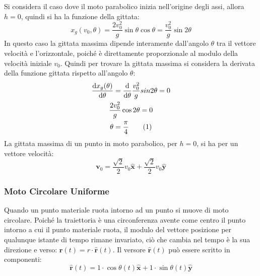\documentclass{article}
\newcommand{\vect}[1]{\boldsymbol{\mathbf{#1}}}
\newcommand{\df}{\mathrm{d}}
\numberwithin{equation}{subsection}
\begin{document}
Si considera il caso dove il moto parabolico inizia nell'origine 
degli assi, allora $h=0$, quindi si ha la funzione della gittata:
\begin{equation}
    x_g(v_0,\theta)=\displaystyle\frac{2v_0^2}{g}\sin\theta \cos\theta=\frac{v_0^2}{g}\sin2\theta
\end{equation}
In questo caso la gittata massima dipende interamente dall'angolo 
$\theta$ tra il vettore velocità e l'orizzontale, poiché è direttamente proporzionale al modulo della velocità iniziale $v_0$. Quindi
per trovare la gittata massima si considera la derivata della funzione gittata rispetto all'angolo $\theta$: 
\begin{gather*}
    \displaystyle\frac{\df x_g(\theta)}{\df\theta}=\frac{\df}{\df\theta}\frac{v_0^2}{g}sin2\theta=0\\
    \displaystyle\frac{2v_0^2}{g}\cos2\theta=0\\
    \theta=\displaystyle\frac{\pi}{4}\tag{\stepcounter{equation}\theequation}
\end{gather*}
La gittata massima di un punto in moto parabolico, per $h=0$, 
si ha per un vettore velocità:
\begin{equation} 
    \vect{v}_0=\displaystyle\frac{\sqrt{2}}{2}v_0\hat{\vect{x}}+\frac{\sqrt{2}}{2}v_0\hat{\vect{y}}
\end{equation}

\subsubsection{Moto Circolare Uniforme}

Quando un punto materiale ruota intorno ad un punto si muove di moto circolare.
Poiché la traiettoria è una circonferenza avente come centro il 
punto intorno a cui il punto materiale ruota, il modulo del vettore posizione 
per qualunque istante di tempo rimane invariato, ciò che cambia nel tempo è 
la sua direzione e verso: $\vect{r}(t)=r\cdot\hat{\vect{r}}(t)$.
Il versore $\hat{\vect{r}}(t)$ può essere scritto in componenti: 
\begin{equation}
    \hat{\vect{r}}(t)=1\cdot \cos\theta(t)\hat{\vect{x}}+1\cdot \sin\theta(t)\hat{\vect{y}}
\end{equation}
\end{document}

